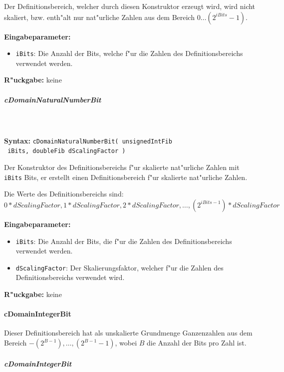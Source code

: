 Der Definitionsbereich, welcher durch diesen Konstruktor erzeugt wird, wird nicht skaliert, bzw. enth"alt nur nat"urliche Zahlen aus dem Bereich $0 \ldots (2^{iBits}-1)$.

\bigskip\noindent
\textbf{Eingabeparameter:}
\begin{itemize}
 \item \verb|iBits|: Die Anzahl der Bits, welche f"ur die Zahlen des Definitionsbereichs verwendet werden.
\end{itemize}

\bigskip\noindent
\textbf{R"uckgabe:} keine


\subparagraph{cDomainNaturalNumberBit}

\ \\\\\noindent
\textbf{Syntax:} \verb|cDomainNaturalNumberBit( unsignedIntFib| \\\verb| iBits, doubleFib dScalingFactor )|

\bigskip\noindent
Der Konstruktor des Definitionsbereichs f"ur skalierte nat"urliche Zahlen mit \verb|iBits| Bits, er erstellt einen Definitionsbereich f"ur skalierte nat"urliche Zahlen.

\bigskip\noindent
Die Werte des Definitionsbereichs sind: $0*dScalingFactor, 1*dScalingFactor, 2*dScalingFactor, \ldots, (2^{iBits-1})*dScalingFactor$

\bigskip\noindent
\textbf{Eingabeparameter:}
\begin{itemize}
 \item \verb|iBits|: Die Anzahl der Bits, die f"ur die Zahlen des Definitionsbereichs verwendet werden.
 \item \verb|dScalingFactor|: Der Skalierungsfaktor, welcher f"ur die Zahlen des Definitionsbereichs verwendet wird.
\end{itemize}

\bigskip\noindent
\textbf{R"uckgabe:} keine



\paragraph{cDomainIntegerBit}

Dieser Definitionsbereich hat als unskalierte Grundmenge Ganzenzahlen aus dem Bereich $-(2^{B-1}), \ldots , (2^{B-1}-1)$, wobei $B$ die Anzahl der Bits pro Zahl ist.


\subparagraph{cDomainIntegerBit}

